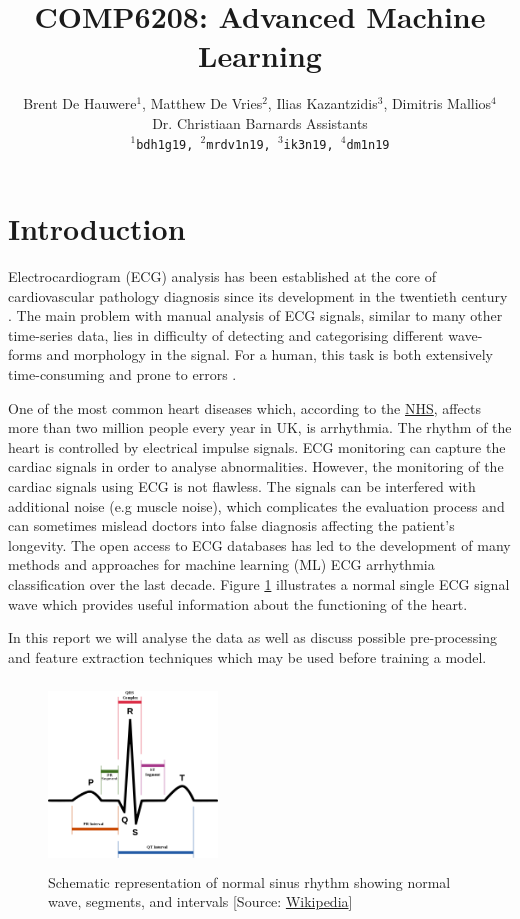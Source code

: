 \documentclass[a4paper,10pt,twocolumn]{article}
\title{
		\usefont{OT1}{bch}{b}{n}
		\huge COMP6208: Advanced Machine Learning\\
}
\author{
  Brent De Hauwere$^1$, Matthew De Vries$^2$, Ilias Kazantzidis$^3$, Dimitris Mallios$^4$ \\Dr. Christiaan Barnards Assistants \\
  \texttt{$^1$bdh1g19, $^2$mrdv1n19, $^3$ik3n19, $^4$dm1n19}
}
\date{}
\begin{document}
\maketitle




\section{Introduction}
Electrocardiogram (ECG) analysis has been established at the core of cardiovascular pathology diagnosis since its development in the twentieth century \cite{alfras}. The main problem with manual analysis of ECG signals, similar to many other time-series data, lies in difficulty of detecting and categorising different wave-forms and morphology in the signal. For a human, this task is both extensively time-consuming and prone to errors \cite{kachuee2018ecg}. 


One of the most common heart diseases which, according to the \href{https://www.nhs.uk/conditions/arrhythmia/}{NHS}, affects more than two million people every year in UK, is arrhythmia. The rhythm of the heart is controlled by electrical impulse signals. ECG monitoring can capture the cardiac signals in order to analyse abnormalities. However, the monitoring of the cardiac signals using ECG is not flawless. The signals can be interfered with additional noise (e.g muscle noise), which complicates the evaluation process and can sometimes mislead doctors into false diagnosis affecting the patient's longevity. The open access to ECG databases has led to the development of many methods and approaches for machine learning (ML) ECG arrhythmia classification over the last decade. Figure \ref{fig:heartbeat} illustrates a normal single ECG signal wave which provides useful information about the functioning of the heart.  

In this report we will analyse the data as well as discuss possible pre-processing and feature extraction techniques which may be used before training a model. 
\begin{figure}[ht]
     \centering
     \includegraphics[height=140pt, width=0.4\textwidth]{images/heartbeat.png}
      \caption{Schematic representation of normal sinus rhythm showing normal wave, segments, and intervals [Source: \href{https://en.wikipedia.org/wiki/Sinus_rhythm}{Wikipedia}]}
      \label{fig:heartbeat}
\end{figure}
\end{document}
